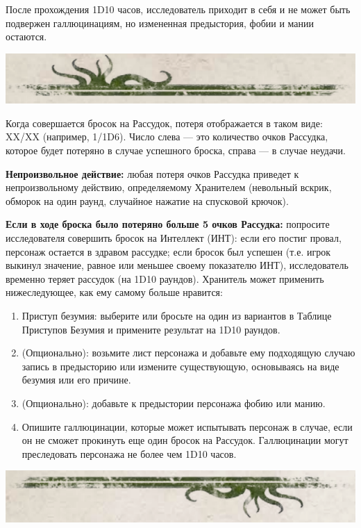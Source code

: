 \documentclass[letterpaper,twocolumn,openany, twoside, 11pt, usenames]{cocbook}
\begin{document}
После прохождения 1D10 часов, исследователь приходит в себя и не может быть подвержен галлюцинациям, но измененная предыстория, фобии и мании остаются.
  \begin{fullcocpaperbox}{}{}
  \includegraphics[width=\linewidth]{img/top.png}
  \begin{multicols}{2}
    Когда совершается бросок на Рассудок, потеря отображается в таком виде: XX/XX (например, 1/1D6). Число слева --- это количество очков Рассудка, которое будет потеряно в случае успешного броска, справа --- в случае неудачи.

    \textbf{Непроизвольное действие:} любая потеря очков Рассудка приведет к непроизвольному действию, определяемому Хранителем (невольный вскрик, обморок на один раунд, случайное нажатие на спусковой крючок).

    \textbf{Если в ходе броска было потеряно больше 5 очков Рассудка:} попросите исследователя совершить бросок на Интеллект (ИНТ): если его постиг провал, персонаж остается в здравом рассудке; если бросок был успешен (т.е. игрок выкинул значение, равное или меньшее своему показателю ИНТ),  исследователь временно теряет рассудок (на 1D10 раундов). Хранитель может применить нижеследующее, как ему самому больше нравится:

    \begin{enumerate}
    \item Приступ безумия: выберите или бросьте на один из вариантов в Таблице Приступов Безумия и примените результат на 1D10 раундов.
    \item (Опционально): возьмите лист персонажа и добавьте ему подходящую случаю запись в предысторию или измените существующую, основываясь на виде безумия или его причине.
    \item  (Опционально): добавьте к предыстории персонажа фобию или манию.
    \item  Опишите галлюцинации, которые может испытывать персонаж в случае, если он не сможет прокинуть еще один бросок на Рассудок. Галлюцинации могут преследовать персонажа не более чем 1D10 часов.
    \end{enumerate}
  \end{multicols}
  \includegraphics[width=\linewidth]{img/bottom.png}
\end{fullcocpaperbox}
\end{document}

